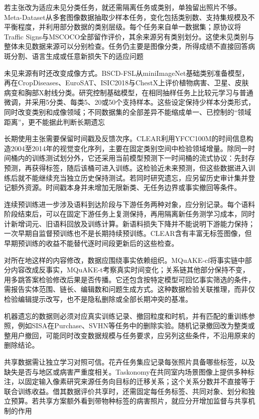 若主张改为适应未见分类任务，就还需隔离任务或类别，单独留出照片不够。Meta-Dataset从多套图像数据抽取少样本任务，变化包括类别数、支持集规模及不平衡程度，并利用部分数据的类别层级。每个任务来自单一数据集；原协议将Traffic Signs与MSCOCO全部留作评价，其余来源另有类别划分。这使未见类别与整体未见数据来源可以分别检查。任务仍主要是图像分类，所得成绩不直接回答病斑分割、语言生成或任意新损失下的适应问题

未见来源有时还改变成像方式。BSCD-FSL从miniImageNet基础类别准备模型，再在CropDiseases、EuroSAT、ISIC2018与ChestX上评价植物病害、卫星、皮肤病变和胸部X射线分类。研究控制基础模型，在相同抽样任务上比较元学习与普通微调，并采用5分类、每类5、20或50个支持样本。这些设定保持少样本分类形式，同时改变类别和成像领域；不同数据集的全部差异不能缩成单一、已控制的“领域距离”，更不能据此判断长期遗忘

长期使用主张需要保留时间戳及反馈次序。CLEAR利用YFCC100M的时间信息构造2004至2014年的视觉变化序列，主要在固定类别空间中检验领域增量。除同一时间桶内的训练测试划分外，它还采用当前模型预测下一时间桶的流式协议：先封存预测，再获得标签，随后该桶可进入训练。这检验近未来预测，但这些数据进入训练后就不能继续充当独立历史保持测试。若同时研究遗忘，应另留历史审计集并登记额外资源。时间戳本身并未增加无限新类、无任务边界或事实撤回等条件。

连续预训练进一步涉及语料到达阶段与下游任务两种对象，应分别记录。每个语料阶段结束后，可以在固定下游任务上复测保持，再用隔离新任务测学习成本，同时计新增词元、旧语料回放及训练计算。新语料损失下降并不能说明下游能力保持；一次早期自监督预训练也不是长期持续预训练。CLEAR含有丰富无标签图像，但早期预训练的收益不能替代逐时间段更新后的这些检查。

对所在地这样的内容修改，数据应围绕事实依赖组织。MQuAKE-cf将事实链中部分内容改成反事实，MQuAKE-t考察真实时间变化；关系链其他部分保持不变，用多跳答案检验修改后果是否传播。它还包含按特定模型可回忆事实筛选的条件，需报告实体范围、链长、编辑数和问题生成方式。这种数据检验关联推理，而非仅检验编辑提示改写，也不是隐私删除或全部长期冲突的基准。

机器遗忘的数据则必须对应真实训练记录、撤回粒度和时机，并有匹配的重训练参照，例如SISA在Purchase、SVHN等任务中的删除实验。随机记录撤回改为整类或整用户撤回，可能同时改变数据规模与任务要求，应另列这些条件，不沿用原来的删除结论。

共享数据需让独立学习对照可信。花卉任务集应记录每张照片具备哪些标签，以及缺失是否与地区或病害严重度相关。Taskonomy在共同室内场景图像上提供多种标注，以固定输入像素研究来源任务向目标的迁移关系；这个关系分数并不直接等于联合训练收益。借其数据评价共享时，还需固定每任务标签、共同对象、划分和独立预算。若共享方案额外看到带物种标签的病害照片，就应分开增加监督与共享机制的作用

